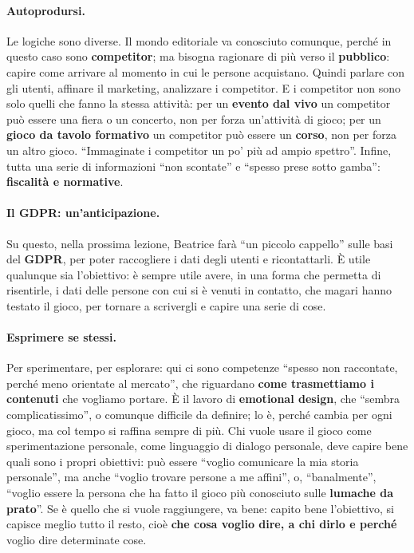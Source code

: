 \paragraph{Autoprodursi.} Le logiche sono diverse. Il mondo editoriale va conosciuto
comunque, perché in questo caso sono \textbf{competitor}; ma bisogna ragionare di più
verso il \textbf{pubblico}: capire come arrivare al momento in cui le persone
acquistano. Quindi parlare con gli utenti, affinare il marketing, analizzare i
competitor. E i competitor non sono solo quelli che fanno la stessa attività: per un
\textbf{evento dal vivo} un competitor può essere una fiera o un concerto, non per
forza un'attività di gioco; per un \textbf{gioco da tavolo formativo} un competitor
può essere un \textbf{corso}, non per forza un altro gioco. ``Immaginate i
competitor un po' più ad ampio spettro''. Infine, tutta una serie di informazioni
``non scontate'' e ``spesso prese sotto gamba'': \textbf{fiscalità e normative}.

\paragraph{Il GDPR: un'anticipazione.} Su questo, nella prossima lezione, Beatrice
farà ``un piccolo cappello'' sulle basi del \textbf{GDPR}, per poter raccogliere i
dati degli utenti e ricontattarli. È utile qualunque sia l'obiettivo: è sempre utile
avere, in una forma che permetta di risentirle, i dati delle persone con cui si è
venuti in contatto, che magari hanno testato il gioco, per tornare a scrivergli e
capire una serie di cose.

\paragraph{Esprimere se stessi.} Per sperimentare, per esplorare: qui ci sono
competenze ``spesso non raccontate, perché meno orientate al mercato'', che
riguardano \textbf{come trasmettiamo i contenuti} che vogliamo portare. È il lavoro
di \textbf{emotional design}, che ``sembra complicatissimo'', o comunque difficile da
definire; lo è, perché cambia per ogni gioco, ma col tempo si raffina sempre di più.
Chi vuole usare il gioco come sperimentazione personale, come linguaggio di dialogo
personale, deve capire bene quali sono i propri obiettivi: può essere ``voglio
comunicare la mia storia personale'', ma anche ``voglio trovare persone a me
affini'', o, ``banalmente'', ``voglio essere la persona che ha fatto il gioco più
conosciuto sulle \textbf{lumache da prato}''. Se è quello che si vuole raggiungere,
va bene: capito bene l'obiettivo, si capisce meglio tutto il resto, cioè
\textbf{che cosa voglio dire, a chi dirlo e perché} voglio dire determinate cose.

